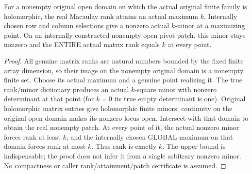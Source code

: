 \begin{theorem}
\label{hir:actual-maximal-rank-nonempty-open-pivot}
\leanok
{}
For a nonempty original open domain on which the actual original finite family
is holomorphic, the real Macaulay rank attains an actual maximum $k$. Internally
chosen row and column selections give a nonzero actual $k$-minor at a maximizing
point. On an internally constructed nonempty open pivot patch, this minor stays
nonzero and the ENTIRE actual matrix rank equals $k$ at every point.
\end{theorem}
\begin{proof}
All genuine matrix ranks are natural numbers bounded by the fixed finite array
dimension, so their image on the nonempty original domain is a nonempty finite
set. Choose its actual maximum and a genuine point realizing it. The true
rank/minor dictionary produces an actual $k$-square minor with nonzero determinant
at that point (for $k=0$ its true empty determinant is one). Original holomorphic
matrix entries give holomorphic finite minors; continuity on the original open
domain makes its nonzero locus open. Intersect with that domain to obtain the
real nonempty patch. At every point of it, the actual nonzero minor forces rank
at least $k$, and the internally chosen GLOBAL maximum on that domain forces
rank at most $k$. Thus rank is exactly $k$. The upper bound is indispensable;
the proof does not infer it from a single arbitrary nonzero minor. No compactness
or caller rank/attainment/patch certificate is assumed.
\end{proof}

